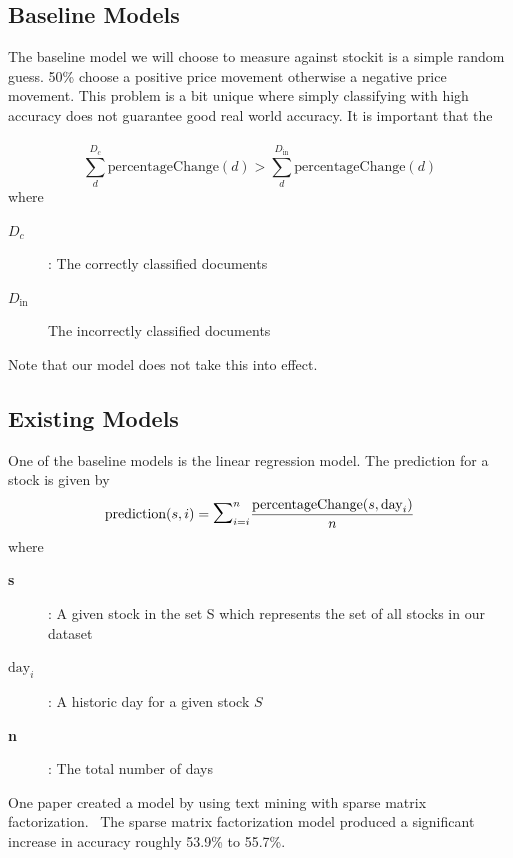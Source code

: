 \documentclass[11pt,letterpaper]{article}
\newcommand{\blue}[1]{\textcolor{RoyalBlue}{#1}}
\newcommand{\instructions}[1]{\blue{\textit{#1}}}
\begin{document}
\subsection{Baseline Models}
\label{sec:baseline-models}
The baseline model we will choose to measure against stockit is a simple random guess.
50\% choose a positive price movement otherwise a negative price movement. This problem is a bit unique
where simply classifying with high accuracy does not guarantee good real world accuracy. It is important that the \\ \\
\begin{equation}\label{acc:constraint}
	\sum_{d}^{D_c} \text{percentageChange}(d) > \sum_{d}^{D_{\text{in}}} \text{percentageChange}(d)
\end{equation}
where
\begin{description}
	\item[\textbf{\(D_c\)}] : The correctly classified documents
	\item[\textbf{\(D_{\text{in}}\)}] The incorrectly classified documents
\end{description}
Note that our model does not take this into effect.

\subsection{Existing Models}
\label{sec:existing-models}
One of the baseline models is the linear regression model. The prediction for a stock is given by
\begin{equation}\label{pred:uniform}
	\text{prediction}(s, i) = \mathlarger{ \mathlarger{ \sum } }_{i=i}^{n} \frac{\text{percentageChange}(s, \text{day}_i) }{ n }
\end{equation}
where \begin{description}
	\item[\textbf{s}] : A given stock in the set S which represents the set of all stocks in our dataset
	\item[\textbf{\(\text{day}_i\)}] : A historic day for a given stock \(S\)
	\item[\textbf{n}] : The total number of days
\end{description}
One paper created a model by using text mining with sparse matrix factorization.~\cite{stock-matrix}
The sparse matrix factorization model produced a significant increase in accuracy roughly 53.9\% to 55.7\%.
\end{document}
